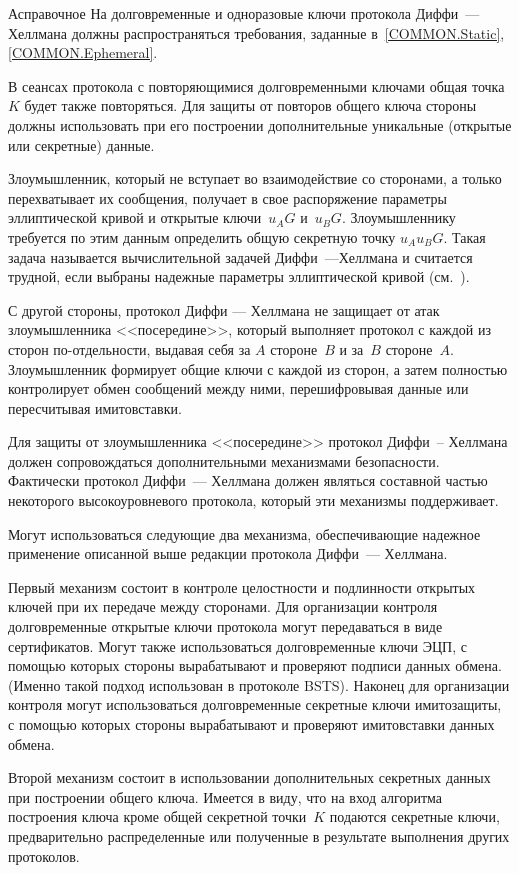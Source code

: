 \begin{appendix}{А}{справочное}
На долговременные и одноразовые ключи протокола Диффи~--- Хеллмана
должны распространяться требования, заданные в~\ref{COMMON.Static}, 
\ref{COMMON.Ephemeral}.

В сеансах протокола с повторяющимися долговременными ключами 
общая точка~$K$ будет также повторяться. 
Для защиты от повторов общего ключа стороны 
должны использовать при его построении 
дополнительные уникальные (открытые или секретные) данные. 

Злоумышленник, который не вступает во взаимодействие со сторонами, 
а только перехватывает их сообщения, получает в свое распоряжение
параметры эллиптической кривой и открытые
ключи~$u_A G$ и~$u_B G$. Злоумышленнику требуется по этим 
данным определить общую секретную точку $u_A u_B G$. 
Такая задача называется вычислительной задачей Диффи~---Хеллмана
и считается трудной, если выбраны надежные параметры эллиптической кривой
(см.~\cite[пункт~4.1.5]{ECC}).

С другой стороны, протокол Диффи --- Хеллмана 
не защищает от атак злоумышленника <<посередине>>,
который выполняет протокол с каждой из сторон 
по-отдельности, выдавая себя за $A$ стороне~$B$ и за~$B$ стороне~$A$.
%
Злоумышленник формирует общие ключи с каждой из сторон,
а затем полностью контролирует обмен сообщений между ними,
перешифровывая данные или пересчитывая имитовставки.

Для защиты от злоумышленника <<посередине>> протокол
Диффи~-- Хеллмана должен сопровождаться дополнительными
механизмами безопасности. 
Фактически протокол Диффи~--- Хеллмана должен являться
составной частью некоторого высокоуровневого протокола,
который эти механизмы поддерживает.

Могут использоваться следующие два механизма, 
обеспечивающие надежное применение описанной выше 
редакции протокола Диффи~--- Хеллмана.

Первый механизм состоит в контроле целостности и подлинности 
открытых ключей при их передаче между сторонами.
%
Для организации контроля 
долговременные открытые ключи протокола могут 
передаваться в виде сертификатов.
%
Могут также использоваться долговременные ключи ЭЦП, с помощью которых стороны
вырабатывают и проверяют подписи данных обмена. (Именно такой подход использован
в протоколе BSTS).
%                               
Наконец для организации контроля могут использоваться 
долговременные секретные ключи имитозащиты,
с помощью которых стороны вырабатывают и проверяют 
имитовставки данных обмена.

Второй механизм состоит в использовании дополнительных секретных
данных при построении общего ключа.
%
Имеется в виду, что на вход алгоритма построения ключа кроме 
общей секретной точки~$K$ подаются секретные ключи,
предварительно распределенные или полученные в результате 
выполнения других протоколов.
%

\end{appendix}

\mbox{}
\vfill
\mbox{}
\clearpage
